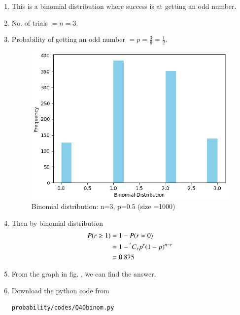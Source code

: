 \renewcommand{\theequation}{\theenumi}
\begin{enumerate}[label=\thesection.\arabic*.,ref=\thesection.\theenumi]
\item This is a binomial distribution where success is at getting an odd number.
\item No. of trials $= n = 3$. 
\item Probability of getting an odd number $= p = \frac{3}{6} = \frac{1}{2}$. 
\begin{figure}[!ht]
\centering
\includegraphics[width= \columnwidth]{./probability/figs/Q40binom.eps}
\caption{Binomial distribution: n=3, p=0.5 (size =1000)}
\end{figure}
\item Then by binomial distribution
\begin{align}
P(r\geq1)&= 1 - P(r=0)\\
&= 1 - \prescript{^n\mkern-0.5mu}{}C_{r}p^{r}(1-p)^{n-r}\\
&= 0.875
\end{align}

\item From the graph in fig. , we can find the answer.
\item Download the python code from
\begin{lstlisting}
probability/codes/Q40binom.py
\end{lstlisting}

\end{enumerate}